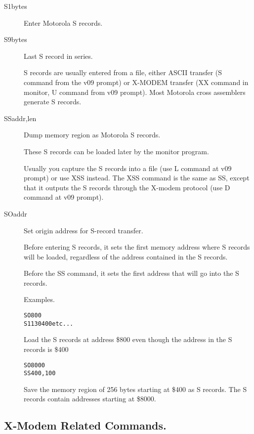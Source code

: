 \begin{description}
\item[S1bytes]     Enter Motorola S records.
\item[S9bytes]     Last S record in series.

S records are usually entered from a file, either ASCII transfer (S command
from the v09 prompt) or X-MODEM transfer (XX command in monitor, U command
from v09 prompt). Most Motorola cross assemblers generate S records. 

\item[SSaddr,len]  Dump memory region as Motorola S records.

These S records can be loaded later by the monitor program.

Usually you capture the S records into a file (use L command at v09 prompt)
or use XSS instead.
The XSS command is the same as SS, except that it outputs the S records
through the X-modem protocol (use D command at v09 prompt).

\item[SOaddr]    Set origin address for S-record transfer.

Before entering S records, it sets the first memory address where S records
will be loaded, regardless of the address contained in the S records.

Before the SS command, it sets the first address that will go into the S
records.

Examples.
\begin{verbatim}
SO800
S1130400etc...
\end{verbatim}
Load the S records at address \$800 even though the address in the S records
is \$400
\begin{verbatim}
SO8000
SS400,100
\end{verbatim}
Save the memory region of 256 bytes starting at \$400 as S records. The S
records contain addresses starting at \$8000.
\end{description}

\subsection{X-Modem Related Commands.}

